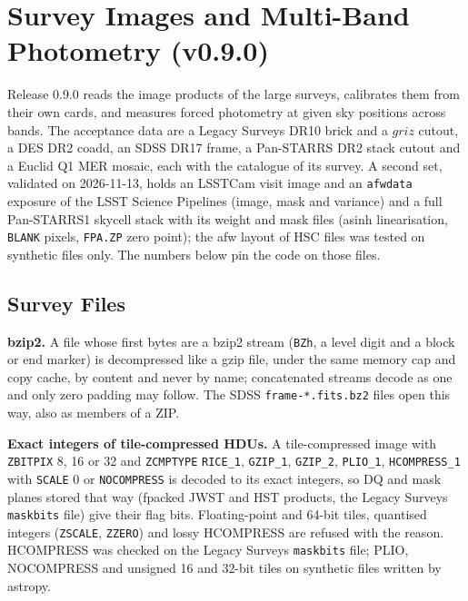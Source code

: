 \documentclass[11pt,a4paper]{article}
\newcommand{\code}[1]{\texttt{\small #1}}
\begin{document}
    \section{Survey Images and Multi-Band Photometry (v0.9.0)}
    \label{sec:survey}

    Release 0.9.0 reads the image products of the large surveys, calibrates them from their own cards, and measures forced photometry at given sky positions across bands. The acceptance data are a Legacy Surveys DR10 brick and a $griz$ cutout, a DES DR2 coadd, an SDSS DR17 frame, a Pan-STARRS DR2 stack cutout and a Euclid Q1 MER mosaic, each with the catalogue of its survey. A second set, validated on 2026-11-13, holds an LSSTCam visit image and an \code{afwdata} exposure of the LSST Science Pipelines (image, mask and variance) and a full Pan-STARRS1 skycell stack with its weight and mask files (asinh linearisation, \code{BLANK} pixels, \code{FPA.ZP} zero point); the afw layout of HSC files was tested on synthetic files only. The numbers below pin the code on those files.

    \subsection{Survey Files}
    \label{sec:survey_files}

    \textbf{bzip2.} A file whose first bytes are a bzip2 stream (\code{BZh}, a level digit and a block or end marker) is decompressed like a gzip file, under the same memory cap and copy cache, by content and never by name; concatenated streams decode as one and only zero padding may follow. The SDSS \code{frame-*.fits.bz2} files open this way, also as members of a ZIP.

    \textbf{Exact integers of tile-compressed HDUs.} A tile-compressed image with \code{ZBITPIX} 8, 16 or 32 and \code{ZCMPTYPE} \code{RICE\_1}, \code{GZIP\_1}, \code{GZIP\_2}, \code{PLIO\_1}, \code{HCOMPRESS\_1} with \code{SCALE} 0 or \code{NOCOMPRESS} is decoded to its exact integers, so DQ and mask planes stored that way (fpacked JWST and HST products, the Legacy Surveys \code{maskbits} file) give their flag bits. Floating-point and 64-bit tiles, quantised integers (\code{ZSCALE}, \code{ZZERO}) and lossy HCOMPRESS are refused with the reason. HCOMPRESS was checked on the Legacy Surveys \code{maskbits} file; PLIO, NOCOMPRESS and unsigned 16 and 32-bit tiles on synthetic files written by astropy.
\end{document}
